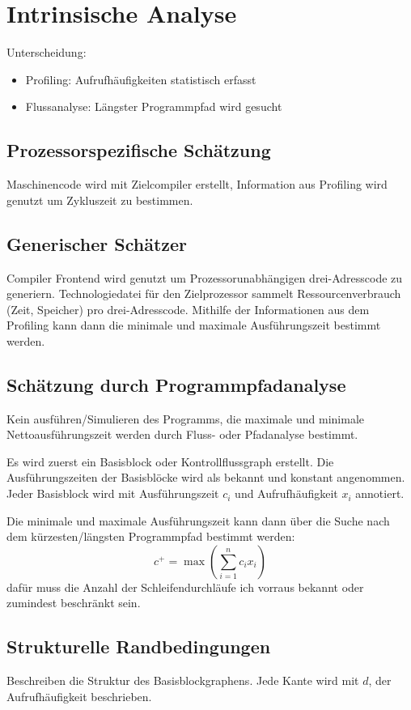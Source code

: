 \chapter{Intrinsische Analyse}
Unterscheidung:
\begin{itemize}
    \item Profiling: Aufrufhäufigkeiten statistisch erfasst
    \item Flussanalyse: Längster Programmpfad wird gesucht
\end{itemize}

\section{Prozessorspezifische Schätzung}
Maschinencode wird mit Zielcompiler erstellt, Information aus Profiling wird
genutzt um Zykluszeit zu bestimmen.

\section{Generischer Schätzer}
Compiler Frontend wird genutzt um Prozessorunabhängigen drei-Adresscode zu generiern.
Technologiedatei für den Zielprozessor sammelt Ressourcenverbrauch (Zeit, Speicher)
pro drei-Adresscode. Mithilfe der Informationen aus dem Profiling kann dann die
minimale und maximale Ausführungszeit bestimmt werden.

\section{Schätzung durch Programmpfadanalyse}
Kein ausführen/Simulieren des Programms, die maximale und minimale Nettoausführungszeit
werden durch Fluss- oder Pfadanalyse bestimmt.

Es wird zuerst ein Basisblock oder Kontrollflussgraph erstellt. Die Ausführungszeiten
der Basisblöcke wird als bekannt und konstant angenommen. Jeder Basisblock
wird mit Ausführungszeit $c_i$ und Aufrufhäufigkeit $x_i$ annotiert.

Die minimale und maximale Ausführungszeit kann dann über die Suche nach dem 
kürzesten/längsten Programmpfad bestimmt werden:
\begin{equation}
    c^+ = \max\left(\sum_{i=1}^n c_i x_i \right)
\end{equation}
dafür muss die Anzahl der Schleifendurchläufe ich vorraus bekannt oder zumindest
beschränkt sein.

\section{Strukturelle Randbedingungen}
Beschreiben die Struktur des Basisblockgraphens. Jede Kante wird mit $d$, der
Aufrufhäufigkeit beschrieben.

